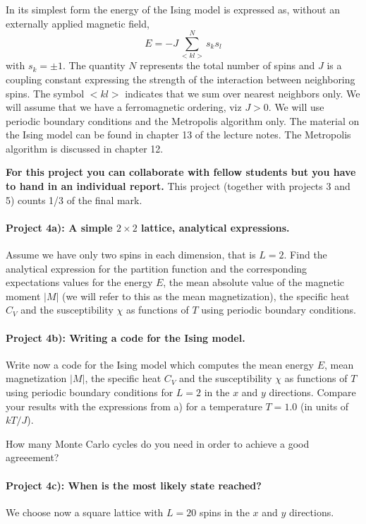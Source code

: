 \documentclass[%
oneside,                 %
final,                   %
10pt]{article}
\begin{document}
In its simplest form
the energy of the Ising model is expressed as, without an externally applied magnetic field, 
\[
E=-J\sum_{< kl >}^{N}s_ks_l 
\]
with
$s_k=\pm 1$. The quantity $N$ represents the total number of spins and $J$ is a coupling
constant expressing the strength of the interaction between
neighboring spins.  The symbol $<kl>$ indicates that we sum over
nearest neighbors only. We will assume that we have a ferromagnetic
ordering, viz $J> 0$.  We will use periodic boundary conditions and
the Metropolis algorithm only. The material on the Ising model can be found in chapter 13 of the lecture notes. The Metropolis algorithm is discussed in chapter 12. 


\textbf{For this project you can collaborate with fellow students but you have to hand in an individual report.}
This project (together with projects 3 and 5) counts 1/3 of the final mark.

\paragraph{Project 4a): A simple $2\times 2$ lattice, analytical expressions.}
Assume we have only two spins in each dimension, that is $L=2$.
Find the analytical expression 
for the partition function and the corresponding
expectations values for the energy $E$, the mean absolute value of the magnetic moment $\vert M\vert$ (we will refer to this as the mean magnetization), 
the specific heat $C_V$ and the susceptibility $\chi$ 
as functions of  $T$ using periodic boundary conditions.

\paragraph{Project 4b): Writing a code for the Ising model.}
Write now a code for the Ising model which computes the mean energy 
$E$, mean magnetization 
$\vert M\vert$, the specific heat $C_V$ and the susceptibility $\chi$ 
as functions of  $T$ using periodic boundary conditions for 
$L=2$ in the $x$ and $y$ directions. 
Compare your results with the expressions from a)
for  a  temperature $T=1.0$ (in units of $kT/J$). 

How many Monte Carlo cycles do you need in order to achieve a 
good agreeement?

\paragraph{Project 4c): When is the most likely state reached?}
We choose now a square lattice with $L=20$ spins in the $x$ and $y$ directions. 
\end{document}

